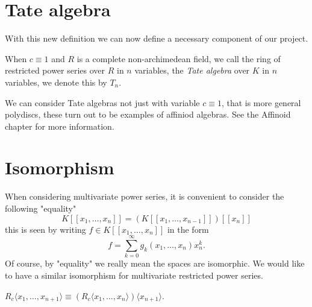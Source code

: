 \section{Tate algebra}

With this new definition we can now define a necessary component of our project.

\begin{definition}
  When $c \equiv 1$ and $R$ is a complete non-archimedean field, we call the ring of restricted power
  series over $R$ in $n$ variables, the \emph{Tate algebra} over $K$ in $n$ variables, we denote this
  by $T_n$.
\end{definition}

We can consider Tate algebras not just with variable $c \equiv 1$, that is more general polydiscs,
these turn out to be examples of affiniod algebras. See the Affinoid chapter for more information.



\section{Isomorphism}

When considering multivariate power series, it is convenient to consider the following "equality"
\[
  K [ \! [ x_1, \dots, x_n ] \! ] = (K [ \! [ x_1, \dots, x_{n-1} ] \! ])[\![ x_n ]\!]
\]
this is seen by writing $f \in K [ \! [ x_1, \dots, x_n ] \! ]$ in the form
\[
  f = \sum_{k = 0}^\infty g_k (x_1, \dots, x_n) x_n^k.
\]
Of course, by "equality" we really mean the spaces are isomorphic. We would like to have a similar
isomorphism for multivariate restricted power series.

\begin{lemma}
  $R_c \langle x_1, \dots, x_{n + 1} \rangle \equiv
  (R_c \langle x_1, \dots, x_n \rangle) \langle x_{n+1} \rangle.$
\end{lemma}

